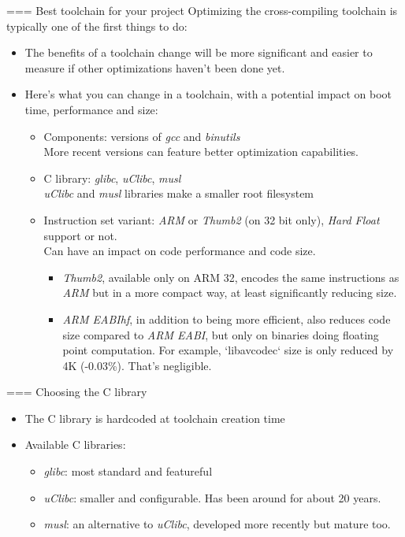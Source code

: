 === Best toolchain for your project Optimizing the cross-compiling toolchain is typically one of the first things to do:
\begin{itemize}
  \item The benefits of a toolchain change will be more significant and easier to
        measure if other optimizations haven't been done yet.
  \item Here's what you can change in a toolchain, with a potential
        impact on boot time, performance and size:
  \begin{itemize}
    \item Components: versions of {\em gcc} and {\em binutils}\\
	  More recent versions can feature better optimization capabilities.
    \item C library: {\em glibc}, {\em uClibc}, {\em musl}\\
	  {\em uClibc} and {\em musl} libraries make a smaller root
	  filesystem
    \item Instruction set variant: {\em ARM} or {\em Thumb2} (on 32 bit
          only), {\em Hard Float} support or not.\\
	  Can have an impact on code performance and code size.
          \begin{itemize}
            \item {\em Thumb2}, available only on ARM 32, encodes the same instructions
                  as {\em ARM} but in a more compact way, at least significantly reducing size.
	    \item {\em ARM EABIhf}, in addition to being more efficient,
                  also reduces code size compared to {\em ARM EABI}, but
                  only on binaries doing floating point computation. For
                  example, `libavcodec` size is only reduced by 4K
                  (-0.03\%). That's negligible.
	  \end{itemize}
  \end{itemize}
\end{itemize}


=== Choosing the C library
\begin{itemize}
  \item The C library is hardcoded at toolchain creation time
  \item Available C libraries:
  \begin{itemize}
    \item {\em glibc}: most standard and featureful
    \item {\em uClibc}: smaller and configurable. Has been around for
	about 20 years.
    \item {\em musl}: an alternative to {\em uClibc}, developed more
        recently but mature too.
  \end{itemize}
\end{itemize}


